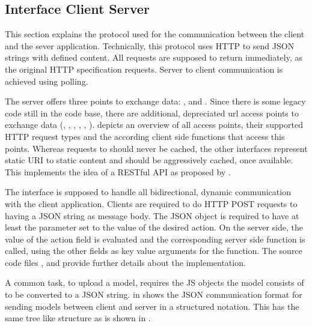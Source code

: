 \subsection{Interface Client Server}
\label{sec:iface_c_s}

This section explains the protocol used for the communication between the client and the sever application.
Technically, this protocol uses HTTP to send JSON strings with defined content.
All requests are supposed to return immediately, as the original HTTP specification requests.
Server to client communication is achieved using polling.

The server offers three points to exchange data: ,  and .
Since there is some legacy code still in the code base, there are additional, depreciated url access points to exchange data (, , , , , ).
 depicts an overview of all access points, their supported HTTP request types and the according client side functions that access this points.
Whereas requests to  should never be cached, the other interfaces represent static URI to static content and should be aggressively cached, once available. This implements the idea of a RESTful API as proposed by \cite{Fielding:2002:PDM:514183.514185}.




The interface  is supposed to handle all bidirectional, dynamic communication with the client application.
Clients are required to do HTTP POST requests to \splurl[api] having a JSON string as message body.
The JSON object is required to have at least the parameter  set to the value of the desired action.
On the server side, the value of the action field is evaluated and the corresponding server side function is called, using the other fields as key value arguments for the function.
The source code files ,  and  provide further details about the implementation.

A common task, to upload a model, requires the JS objects the model consists of to be converted to a JSON string.
 in  shows the JSON communication format for sending models between client and server in a structured notation. This has the same tree like structure as is shown in .


